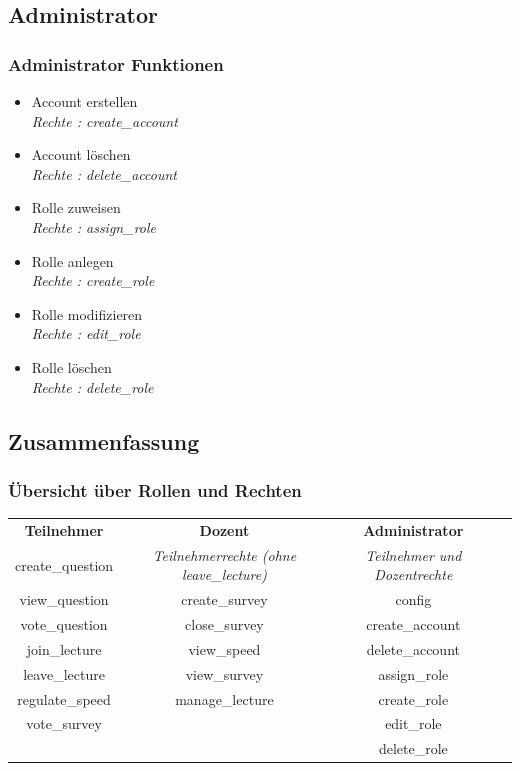 \documentclass[german,a4paper]{beamer}
\begin{document}
\subsection{Administrator}
\begin{frame} 
\frametitle{Administrator Funktionen}
\begin{itemize}
  \item{}
  Account erstellen \\
  \quad \emph{Rechte : create\_account}
  \item{} 
  Account l\"{o}schen  \\
  \quad \emph{Rechte : delete\_account}
  \item{} 
  Rolle zuweisen  \\
  \quad \emph{Rechte : assign\_role}
  \item{} 
  Rolle anlegen  \\
  \quad \emph{Rechte : create\_role}
  \item{} 
  Rolle modifizieren  \\
  \quad \emph{Rechte : edit\_role}
  \item{} 
  Rolle l\"{o}schen  \\
  \quad \emph{Rechte : delete\_role}
\end{itemize}
\end{frame}

\subsection{Zusammenfassung}
\begin{frame} 
\frametitle{\"{U}bersicht \"{u}ber Rollen und Rechten}
\resizebox{11,5cm}{!} {
  \begin{tabular}{c<{\onslide<2->} c<{\onslide<3->}c<{\onslide}c}
  \textbf{Teilnehmer} & \textbf{Dozent} & \textbf{Administrator} \\
  create\_question  & \emph{Teilnehmerrechte (ohne leave\_lecture)} & \emph{Teilnehmer und Dozentrechte} \\
  view\_question & create\_survey & config \\
  vote\_question & close\_survey & create\_account\\
  join\_lecture & view\_speed & delete\_account \\
  leave\_lecture & view\_survey & assign\_role \\
  regulate\_speed & manage\_lecture & create\_role \\
  vote\_survey & & edit\_role \\
  & & delete\_role \\
  \end{tabular}
}
\end{frame}
\end{document}
